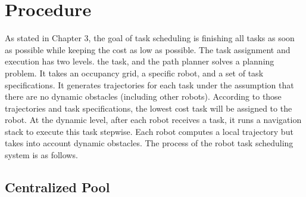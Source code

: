 


\section{Procedure}
\label{sec:task_scheduling_procedure}
As stated in Chapter 3, the goal of task scheduling is finishing all tasks as soon as possible while keeping the cost as low as possible. 
The task assignment and execution has two levels. \cite{Ivan2017} the task, and the path planner solves a planning problem. It takes an occupancy grid, a specific robot, and a set of task specifications. It generates trajectories for each task under the assumption that there are no dynamic obstacles (including other robots). According to those trajectories and task specifications, the lowest cost task will be assigned to the robot.
At the dynamic level, after each robot receives a task, it runs a navigation stack to execute this task stepwise. Each robot computes a local trajectory but takes into account dynamic obstacles.
The process of the robot task scheduling system is as follows.

\subsection{Centralized Pool}

